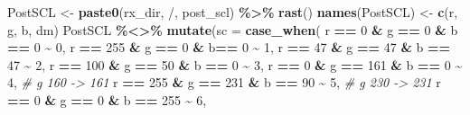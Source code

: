 \documentclass[
]{article}
\newenvironment{Shaded}{\begin{snugshade}}{\end{snugshade}}
\newcommand{\AttributeTok}[1]{\textcolor[rgb]{0.13,0.29,0.53}{#1}}
\newcommand{\CommentTok}[1]{\textcolor[rgb]{0.56,0.35,0.01}{\textit{#1}}}
\newcommand{\DecValTok}[1]{\textcolor[rgb]{0.00,0.00,0.81}{#1}}
\newcommand{\FunctionTok}[1]{\textcolor[rgb]{0.13,0.29,0.53}{\textbf{#1}}}
\newcommand{\NormalTok}[1]{#1}
\newcommand{\OtherTok}[1]{\textcolor[rgb]{0.56,0.35,0.01}{#1}}
\newcommand{\SpecialCharTok}[1]{\textcolor[rgb]{0.81,0.36,0.00}{\textbf{#1}}}
\newcommand{\StringTok}[1]{\textcolor[rgb]{0.31,0.60,0.02}{#1}}
\begin{document}
\begin{Shaded}
\begin{Highlighting}[]
\NormalTok{        PostSCL }\OtherTok{\textless{}{-}} \FunctionTok{paste0}\NormalTok{(rx\_dir, }\StringTok{\textquotesingle{}/\textquotesingle{}}\NormalTok{, post\_scl) }\SpecialCharTok{\%\textgreater{}\%} 
                    \FunctionTok{rast}\NormalTok{() }
        \FunctionTok{names}\NormalTok{(PostSCL) }\OtherTok{\textless{}{-}} \FunctionTok{c}\NormalTok{(}\StringTok{\textquotesingle{}r\textquotesingle{}}\NormalTok{, }\StringTok{\textquotesingle{}g\textquotesingle{}}\NormalTok{, }\StringTok{\textquotesingle{}b\textquotesingle{}}\NormalTok{, }\StringTok{\textquotesingle{}dm\textquotesingle{}}\NormalTok{)}
\NormalTok{        PostSCL }\SpecialCharTok{\%\textless{}\textgreater{}\%}
          \FunctionTok{mutate}\NormalTok{(}\AttributeTok{sc =} \FunctionTok{case\_when}\NormalTok{(}
\NormalTok{            r }\SpecialCharTok{==} \DecValTok{0} \SpecialCharTok{\&}\NormalTok{ g }\SpecialCharTok{==} \DecValTok{0} \SpecialCharTok{\&}\NormalTok{ b  }\SpecialCharTok{==} \DecValTok{0} \SpecialCharTok{\textasciitilde{}} \DecValTok{0}\NormalTok{, }
\NormalTok{            r }\SpecialCharTok{==} \DecValTok{255} \SpecialCharTok{\&}\NormalTok{ g }\SpecialCharTok{==} \DecValTok{0} \SpecialCharTok{\&}\NormalTok{ b}\SpecialCharTok{==} \DecValTok{0} \SpecialCharTok{\textasciitilde{}} \DecValTok{1}\NormalTok{, }
\NormalTok{            r }\SpecialCharTok{==} \DecValTok{47} \SpecialCharTok{\&}\NormalTok{ g }\SpecialCharTok{==} \DecValTok{47} \SpecialCharTok{\&}\NormalTok{ b }\SpecialCharTok{==} \DecValTok{47} \SpecialCharTok{\textasciitilde{}} \DecValTok{2}\NormalTok{,}
\NormalTok{            r }\SpecialCharTok{==} \DecValTok{100} \SpecialCharTok{\&}\NormalTok{ g }\SpecialCharTok{==} \DecValTok{50} \SpecialCharTok{\&}\NormalTok{ b }\SpecialCharTok{==} \DecValTok{0} \SpecialCharTok{\textasciitilde{}} \DecValTok{3}\NormalTok{,}
\NormalTok{            r }\SpecialCharTok{==} \DecValTok{0} \SpecialCharTok{\&}\NormalTok{ g }\SpecialCharTok{==} \DecValTok{161} \SpecialCharTok{\&}\NormalTok{ b }\SpecialCharTok{==} \DecValTok{0} \SpecialCharTok{\textasciitilde{}} \DecValTok{4}\NormalTok{,        }\CommentTok{\# g 160 {-}\textgreater{} 161}
\NormalTok{            r }\SpecialCharTok{==} \DecValTok{255} \SpecialCharTok{\&}\NormalTok{ g }\SpecialCharTok{==} \DecValTok{231} \SpecialCharTok{\&}\NormalTok{ b }\SpecialCharTok{==} \DecValTok{90} \SpecialCharTok{\textasciitilde{}} \DecValTok{5}\NormalTok{,     }\CommentTok{\# g 230 {-}\textgreater{} 231}
\NormalTok{            r }\SpecialCharTok{==} \DecValTok{0} \SpecialCharTok{\&}\NormalTok{ g }\SpecialCharTok{==} \DecValTok{0} \SpecialCharTok{\&}\NormalTok{ b }\SpecialCharTok{==} \DecValTok{255} \SpecialCharTok{\textasciitilde{}} \DecValTok{6}\NormalTok{, }

\end{Highlighting}
\end{Shaded}
\end{document}
